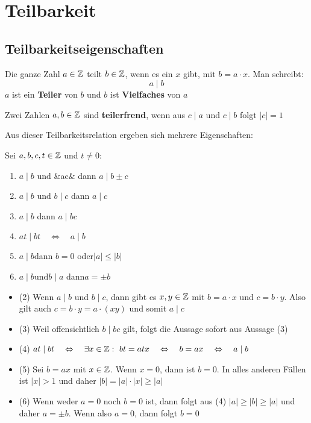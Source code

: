 \documentclass[main.tex]{subfiles}
\begin{document}
\section{Teilbarkeit}
\subsection{Teilbarkeitseigenschaften}

\begin{Definition}
	Die ganze Zahl $a\in\mathbb{Z}$ teilt $b\in\mathbb{Z}$, wenn es ein $x$ gibt, mit $b=a\cdot x$. Man schreibt:
	$$a \mid b$$
	$a$ ist ein \textbf{Teiler} von $b$ und $b$ ist \textbf{Vielfaches} von $a$

	Zwei Zahlen $a,b\in\mathbb{Z}$  sind \textbf{teilerfrend}, wenn aus $ c \mid  a  $ und $c\mid b$ folgt $|c| =1$
\end{Definition}

\begin{Theorem}
	Aus dieser Teilbarkeitsrelation ergeben sich mehrere Eigenschaften:
	
	Sei $a,b,c,t\in\mathbb{Z}$ und $t\neq0$:
	\begin{enumerate}
		\item $a\mid b$ \quad und \quad&a\mid c& \quad dann \quad $a \mid b\pm c $
		\item $a\mid b$ \quad und \quad$b \mid c$ \quad dann \quad $a \mid c$
		\item $a\mid b$ \quad dann \quad $a \mid bc$
		\item $at\mid bt\quad\Leftrightarrow\quad a \mid b$
		\item $a\mid b$\quad dann \quad $b=0$ \quad oder\quad $|a| \leq |b|$
		\item $a\mid b$\quad und\quad $b\mid a$ \quad dann\quad $a=\pm b$
	\end{enumerate}
\end{Theorem}

\begin{Beweis}
	\begin{itemize}
		\item (2) \quad Wenn $a \mid b$ und $b \mid c$, dann gibt es $x,y\in\mathbb{Z}$ mit $b=a\cdot x$ und $c=b\cdot y$. Also gilt auch $c=b\cdot y=a\cdot(xy)$ und somit $a\mid c$\\
		\item (3) \quad Weil offensichtlich $b\mid bc$ gilt, folgt die Aussage sofort aus Aussage (3) \\
		\item (4)  \quad $at\mid bt\quad \Leftrightarrow\quad \exists x \in \mathbb{Z} : \, \, bt=atx \quad\Leftrightarrow \quad b=ax \quad\Leftrightarrow \quad a\mid b$ \\
		\item (5) \quad Sei $b=ax$ mit $x\in\mathbb{Z}$. Wenn $x=0$, dann ist $b=0$. In alles anderen Fällen ist $|x| >1$ und daher $|b|  = |a|  \cdot |x|  \geq |a| $
		\item (6) \quad Wenn weder $a=0$ noch $b=0$ ist, dann folgt aus (4) $|a| \geq|b| \geq|a| $ und daher $a=\pm b$. Wenn also  $a=0$, dann folgt $b=0$
	\end{itemize}
\end{Beweis}
\end{document}
